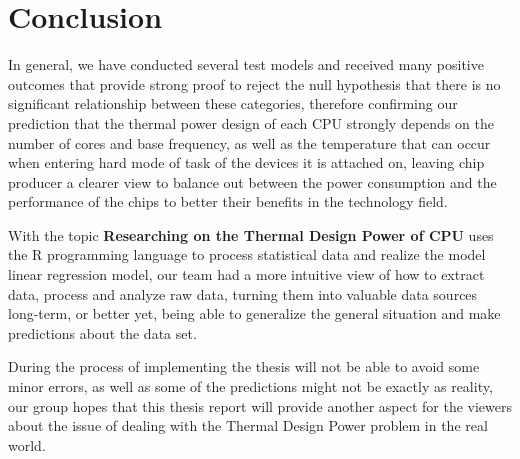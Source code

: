 %
%
%   
\clearpage
\section{Conclusion}
In general, we have conducted several test models and received many positive outcomes that provide strong proof to reject the null hypothesis that there is no significant relationship between these categories, therefore confirming our prediction that the thermal power design of each CPU strongly depends on the number of cores and base frequency, as well as the temperature that can occur when entering hard mode of task of the devices it is attached on, leaving chip producer a clearer view to balance out between the power consumption and the performance of the chips to better their benefits in the technology field.

With the topic \textbf{Researching on the Thermal Design Power of CPU} uses the R programming language to process statistical data and realize the model linear regression model, our team had a more intuitive view of how to extract data, process and analyze raw data, turning them into valuable data sources long-term, or better yet, being able to generalize the general situation and make predictions about the data set.

During the process of implementing the thesis will not be able to avoid some minor errors, as well as some of the predictions might not be exactly as reality, our group hopes that this thesis report will provide another aspect for the viewers about the issue of dealing with the Thermal Design Power problem in the real world.